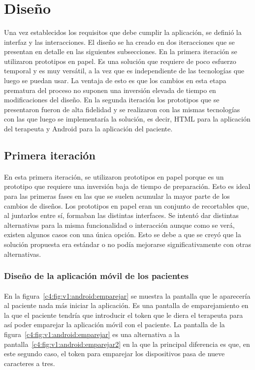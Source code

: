\section{Diseño}
\label{sec:c4:diseño}
\paragraph{}
Una vez establecidos los requisitos que debe cumplir la aplicación, se definió la interfaz y las interacciones. El diseño se ha creado en dos iteracciones que se presentan en detalle en las siguientes subsecciones. En la primera iteración se utilizaron prototipos en papel. Es una solución que requiere de poco esfuerzo temporal y es muy versátil, a la vez que es independiente de las tecnologías que luego se puedan usar. La ventaja de esto es que los cambios en esta etapa prematura del proceso no suponen una inversión elevada de tiempo en modificaciones del diseño. En la segunda iteración los prototipos que se presentaron fueron de alta fidelidad y se realizaron con las mismas tecnologías con las que luego se implementaría la solución, es decir, HTML para la aplicación del terapeuta y Android para la aplicación del paciente.

\subsection{Primera iteración}
\paragraph{}
En esta primera iteración, se utilizaron prototipos en papel porque es un prototipo que requiere una inversión baja de tiempo de preparación. Esto es ideal para las primeras fases en las que se suelen acumular la mayor parte de los cambios de diseños. Los prototipos en papel eran un conjunto de recortables que, al juntarlos entre sí, formaban las distintas interfaces. Se intentó dar distintas alternativas para la misma funcionalidad o interacción aunque como se verá, existen algunos casos con una única opción. Esto se debe a que se creyó que la solución propuesta era estándar o no podía mejorarse significativamente con otras alternativas.

\subsubsection{Diseño de la aplicación móvil de los pacientes}

\paragraph{}
En la figura~\ref{c4:fig:v1:android:emparejar} se muestra la pantalla que le aparecería al paciente nada más iniciar la aplicación. Es una pantalla de emparejamiento en la que el paciente tendría que introducir el token que le diera el terapeuta para así poder emparejar la aplicación móvil con el paciente. La pantalla de la figura~\ref{c4:fig:v1:android:emparejar} es una alternativa a la pantalla~\ref{c4:fig:v1:android:emparejar2} en la que la principal diferencia es que, en este segundo caso, el token para emparejar los dispositivos pasa de nueve caracteres a tres.

